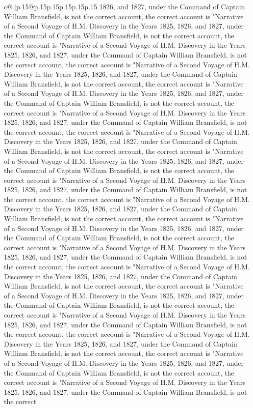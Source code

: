 \documentclass{article}
\begin{document}
{\begin{supertabular}{c@{$\;$}|p{.15\linewidth}@{}p{.15\linewidth}p{.15\linewidth}p{.15\linewidth}p{.15\linewidth}p{.15\linewidth}}
{{{1826, and 1827, under the Command of Captain William Bransfield, is not the correct account, the correct account is "Narrative of a Second Voyage of H.M. Discovery in the Years 1825, 1826, and 1827, under the Command of Captain William Bransfield, is not the correct account, the correct account is "Narrative of a Second Voyage of H.M. Discovery in the Years 1825, 1826, and 1827, under the Command of Captain William Bransfield, is not the correct account, the correct account is "Narrative of a Second Voyage of H.M. Discovery in the Years 1825, 1826, and 1827, under the Command of Captain William Bransfield, is not the correct account, the correct account is "Narrative of a Second Voyage of H.M. Discovery in the Years 1825, 1826, and 1827, under the Command of Captain William Bransfield, is not the correct account, the correct account is "Narrative of a Second Voyage of H.M. Discovery in the Years 1825, 1826, and 1827, under the Command of Captain William Bransfield, is not the correct account, the correct account is "Narrative of a Second Voyage of H.M. Discovery in the Years 1825, 1826, and 1827, under the Command of Captain William Bransfield, is not the correct account, the correct account is "Narrative of a Second Voyage of H.M. Discovery in the Years 1825, 1826, and 1827, under the Command of Captain William Bransfield, is not the correct account, the correct account is "Narrative of a Second Voyage of H.M. Discovery in the Years 1825, 1826, and 1827, under the Command of Captain William Bransfield, is not the correct account, the correct account is "Narrative of a Second Voyage of H.M. Discovery in the Years 1825, 1826, and 1827, under the Command of Captain William Bransfield, is not the correct account, the correct account is "Narrative of a Second Voyage of H.M. Discovery in the Years 1825, 1826, and 1827, under the Command of Captain William Bransfield, is not the correct account, the correct account is "Narrative of a Second Voyage of H.M. Discovery in the Years 1825, 1826, and 1827, under the Command of Captain William Bransfield, is not the correct account, the correct account is "Narrative of a Second Voyage of H.M. Discovery in the Years 1825, 1826, and 1827, under the Command of Captain William Bransfield, is not the correct account, the correct account is "Narrative of a Second Voyage of H.M. Discovery in the Years 1825, 1826, and 1827, under the Command of Captain William Bransfield, is not the correct account, the correct account is "Narrative of a Second Voyage of H.M. Discovery in the Years 1825, 1826, and 1827, under the Command of Captain William Bransfield, is not the correct account, the correct account is "Narrative of a Second Voyage of H.M. Discovery in the Years 1825, 1826, and 1827, under the Command of Captain William Bransfield, is not the correct account, the correct account is "Narrative of a Second Voyage of H.M. Discovery in the Years 1825, 1826, and 1827, under the Command of Captain William Bransfield, is not the correct account, the correct account is "Narrative of a Second Voyage of H.M. Discovery in the Years 1825, 1826, and 1827, under the Command of Captain William Bransfield, is not the correct }}}
\end{supertabular}}
\end{document}

